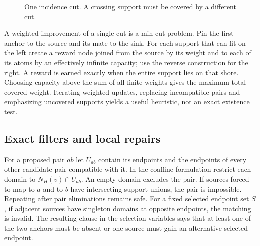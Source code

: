 \documentclass[11pt,a4paper]{article}
\theoremstyle{definition}\newtheorem{definition}[theorem]{Definition}\newtheorem{example}[theorem]{Example}
\theoremstyle{remark}\newtheorem{remark}[theorem]{Remark}
\begin{document}
\begin{figure}[ht]\centering
{}
\caption{One incidence cut. A crossing support must be covered by a different cut.}\end{figure}

A weighted improvement of a single cut is a min-cut problem. Pin the first anchor to the source and its mate to the sink. For each support that can fit on the left create a reward node joined from the source by its weight and to each of its atoms by an effectively infinite capacity; use the reverse construction for the right. A reward is earned exactly when the entire support lies on that shore. Choosing capacity above the sum of all finite weights gives the maximum total covered weight. Iterating weighted updates, replacing incompatible pairs and emphasizing uncovered supports yields a useful heuristic, not an exact existence test.

\subsection{Exact filters and local repairs}
For a proposed pair \(ab\) let \(U_{ab}\) contain its endpoints and the endpoints of every other candidate pair compatible with it. In the coaffine formulation restrict each domain to \(N_H(v)\cap U_{ab}\). An empty domain excludes the pair. If sources forced to map to \(a\) and to \(b\) have intersecting support unions, the pair is impossible. Repeating after pair eliminations remains safe. For a fixed selected endpoint set \(S\), if adjacent sources have singleton domains at opposite endpoints, the matching is invalid. The resulting clause in the selection variables says that at least one of the two anchors must be absent or one source must gain an alternative selected endpoint.
\end{document}
